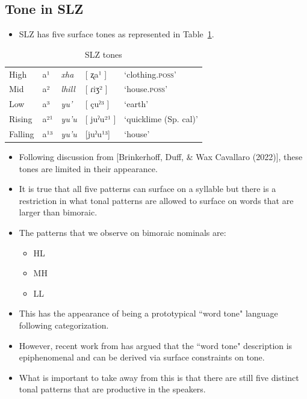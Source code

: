 \documentclass[12pt, letterpaper]{article}
\providecommand{\lsptoprule}{\midrule\toprule}
\providecommand{\lspbottomrule}{\bottomrule\midrule}
\begin{document}
\subsection{Tone in SLZ} \label{sec:Tone}

\begin{itemize}
	\item SLZ has five surface tones as represented in Table~\ref{tab:tones}.
\end{itemize}

\begin{table}[!h]
	\centering
	\caption{SLZ tones}
	\label{tab:tones}
	 \begin{tabular}{lllll}
	  \lsptoprule
	  High   	&  a¹  &  \textit{xha}   &  [ ʐa¹ ] & `clothing.\textsc{poss}'\\
		Mid    	&  a²  &  \textit{lhill} 	& [ ɾiʒ² ] & `house.\textsc{poss}' \\
		Low   	&  a³  &  \textit{yu'} 	&	 [ çuˀ³ ] & `earth'\\
		Rising	&  a²¹  &  \textit{yu'u} 	&	[ juˀu²¹ ] & `quicklime (Sp. cal)' \\
		Falling &  a¹³  &  \textit{yu'u}  &	[juˀu¹³] &	`house' \\
	  \lspbottomrule
	 \end{tabular}
\end{table}

\begin{itemize}
	\item Following discussion from [Brinkerhoff, Duff, \& Wax Cavallaro (2022)], these tones are limited in their appearance.
	\item It is true that all five patterns can surface on a syllable but there is a restriction in what tonal patterns are allowed to surface on words that are larger than bimoraic.
	\item The patterns that we observe on bimoraic nominals are:
	\begin{itemize}
		\item HL 
		\item MH 
		\item LL 
	\end{itemize}
	\item This has the appearance of being a prototypical ``word tone" language following  categorization. 
	\item However, recent work from \citet{shihAutosegmentalAimsSurfaceOptimizing2019,mcphersonWordToneEpiphenomenalInpress} has argued that the ``word tone" description is epiphenomenal and can be derived via surface constraints on tone. 
	\item What is important to take away from this is that there are still five distinct tonal patterns that are productive in the speakers. 
\end{itemize}
\end{document}
